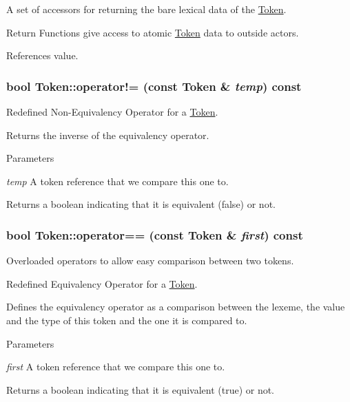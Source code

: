 A set of accessors for returning the bare lexical data of the \hyperlink{classToken}{Token}. 

Return Functions give access to atomic \hyperlink{classToken}{Token} data to outside actors.

References value.

\hypertarget{classToken_a2f5a82fe3f636917336cc5171f4f53c2}{
\subsubsection[{operator!=}]{\setlength{\rightskip}{0pt plus 5cm}bool Token::operator!= (const {\bf Token} \& {\em temp}) const}}
\label{classToken_a2f5a82fe3f636917336cc5171f4f53c2}


Redefined Non-\/Equivalency Operator for a \hyperlink{classToken}{Token}. 

Returns the inverse of the equivalency operator.


\begin{DoxyParams}{Parameters}
\item[{\em temp}]A token reference that we compare this one to. \end{DoxyParams}
\begin{DoxyReturn}{Returns}
a boolean indicating that it is equivalent (false) or not. 
\end{DoxyReturn}
\hypertarget{classToken_afefbe9d487b40b055403fa2c41004d99}{
\subsubsection[{operator==}]{\setlength{\rightskip}{0pt plus 5cm}bool Token::operator== (const {\bf Token} \& {\em first}) const}}
\label{classToken_afefbe9d487b40b055403fa2c41004d99}


Overloaded operators to allow easy comparison between two tokens. 

Redefined Equivalency Operator for a \hyperlink{classToken}{Token}.

Defines the equivalency operator as a comparison between the lexeme, the value and the type of this token and the one it is compared to.


\begin{DoxyParams}{Parameters}
\item[{\em first}]A token reference that we compare this one to. \end{DoxyParams}
\begin{DoxyReturn}{Returns}
a boolean indicating that it is equivalent (true) or not. 
\end{DoxyReturn}


